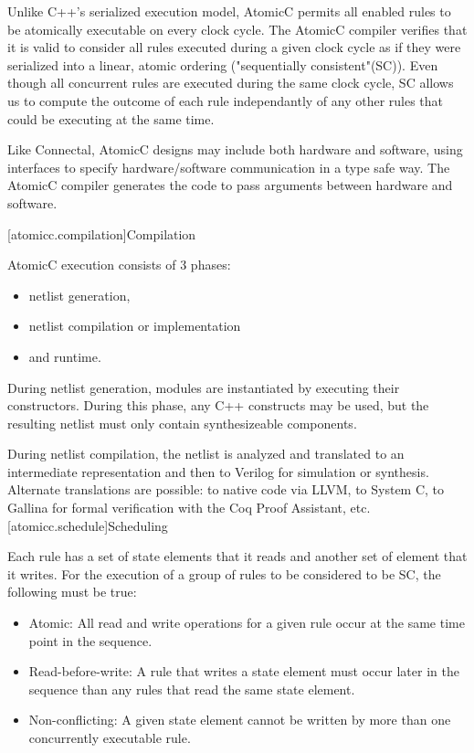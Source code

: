 Unlike C++'s serialized execution model, AtomicC permits all enabled rules to be atomically executable on
every clock cycle.  The AtomicC compiler verifies that it is valid to consider
all rules executed during a given clock cycle
as if they were serialized into a linear, atomic ordering ("sequentially consistent"(SC)).
Even though all concurrent rules are executed during the same clock cycle, SC allows us to compute the
outcome of each rule independantly of any other rules that could be executing at the same time.

Like Connectal, AtomicC designs may include both hardware and
software, using interfaces to specify hardware/software communication
in a type safe way. The AtomicC compiler generates the code to pass
arguments between hardware and software.

[atomicc.compilation]{Compilation}

AtomicC execution consists of 3 phases:
\begin{itemize}
\item netlist generation, 
\item netlist compilation or implementation
\item and runtime.
\end{itemize}

During netlist
generation, modules are instantiated by executing their
constructors. During this phase, any C++ constructs may be used, but
the resulting netlist must only contain synthesizeable components.

During netlist compilation, the netlist is analyzed and translated to
an intermediate representation and then to Verilog for simulation or
synthesis. Alternate translations are possible: to native code via
LLVM, to System C, to Gallina for formal verification with the Coq
Proof Assistant, etc.
\newpage
{}[atomicc.schedule]{Scheduling}

Each rule has a set of state elements that it reads and another set of element that it writes.
For the execution of a group of rules to be considered to be SC, the following must
be true:

\begin{itemize}
\item Atomic: All read and write operations for a given rule occur at the same time point in the sequence.
\item Read-before-write:  A rule that writes a state element must occur later in the sequence
than any rules that read the same state element.
\item Non-conflicting: A given state element cannot be written by more than one concurrently executable rule.
\end{itemize}

